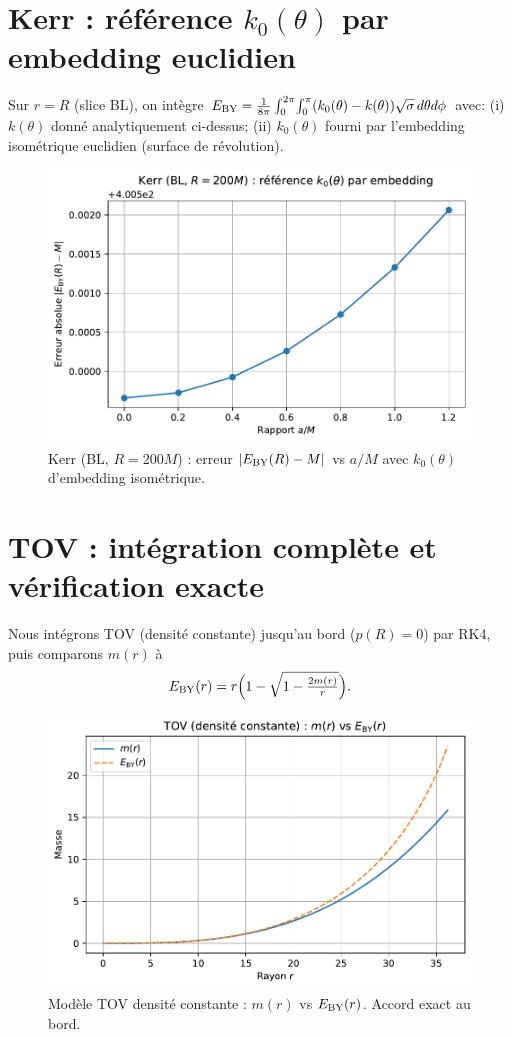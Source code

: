 \documentclass[11pt]{article}
\begin{document}
\section{Kerr : r\'ef\'erence $k_0(\theta)$ par embedding euclidien}
Sur $r=R$ (slice BL), on int\`egre $E_{\rm BY}=\frac{1}{8\pi}\int_0^{2\pi}\!\int_0^\pi (k_0(\theta)-k(\theta))\sqrt{\sigma}\, d\theta d\phi$ avec:
(i) $k(\theta)$ donn\'e analytiquement ci-dessus; 
(ii) $k_0(\theta)$ fourni par l'embedding isom\'etrique euclidien (surface de r\'evolution).
\begin{figure}[!htb]
\centering
\includegraphics[width=.75\linewidth]{fig_kerr_embedding_refined.pdf}
\caption{Kerr (BL, $R=200M$) : erreur $|E_{\rm BY}(R)-M|$ vs $a/M$ avec $k_0(\theta)$ d'embedding isom\'etrique.}
\end{figure}
\clearpage

\section{TOV : int\'egration compl\`ete et v\'erification exacte}
Nous int\'egrons TOV (densit\'e constante) jusqu'au bord (\(p(R)=0\)) par RK4, puis comparons $m(r)$ \`a 
\begin{equation}
E_{\rm BY}(r)=r\Big(1-\sqrt{1-\tfrac{2m(r)}{r}}\Big).
\end{equation}
\begin{figure}[!htb]
\centering
\includegraphics[width=.75\linewidth]{fig_tov_full.pdf}
\caption{Mod\`ele TOV densit\'e constante : $m(r)$ vs $E_{\rm BY}(r)$. Accord exact au bord.}
\end{figure}
\clearpage
\end{document}
